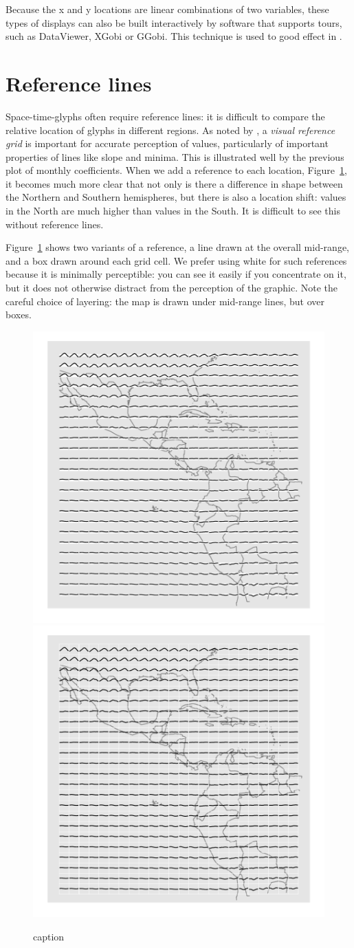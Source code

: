 \documentclass[oneside]{article}
\begin{document}
Because the x and y locations are linear combinations of two variables, these types of displays can also be built interactively by software that supports tours, such as DataViewer, XGobi or GGobi.  This technique is used to good effect in \citet{buja:1996a}.

\section{Reference lines}

Space-time-glyphs often require reference lines: it is difficult to compare the relative location of glyphs in different regions. As noted by \citet{cleveland:1993a}, a \emph{visual reference grid} is important for accurate perception of values, particularly of important properties of lines like slope and minima. This is illustrated well by the previous plot of monthly coefficients. When we add a reference to each location, Figure~\ref{fig:ref-basic}, it becomes much more clear that not only is there a difference in shape between the Northern and Southern hemispheres, but there is also a location shift: values in the North are much higher than values in the South. It is difficult to see this without reference lines.

Figure~\ref{fig:ref-basic} shows two variants of a reference, a line drawn at the overall mid-range, and a box drawn around each grid cell. We prefer using white for such references because it is minimally perceptible: you can see it easily if you concentrate on it, but it does not otherwise distract from the perception of the graphic. Note the careful choice of layering: the map is drawn under mid-range lines, but over boxes.

\begin{figure}[htbp]
  \centering
  \includegraphics[width=0.5\linewidth]{ref-line}%
  \includegraphics[width=0.5\linewidth]{ref-box}
  \caption{caption}
  \label{fig:ref-basic}
\end{figure}
\end{document}
